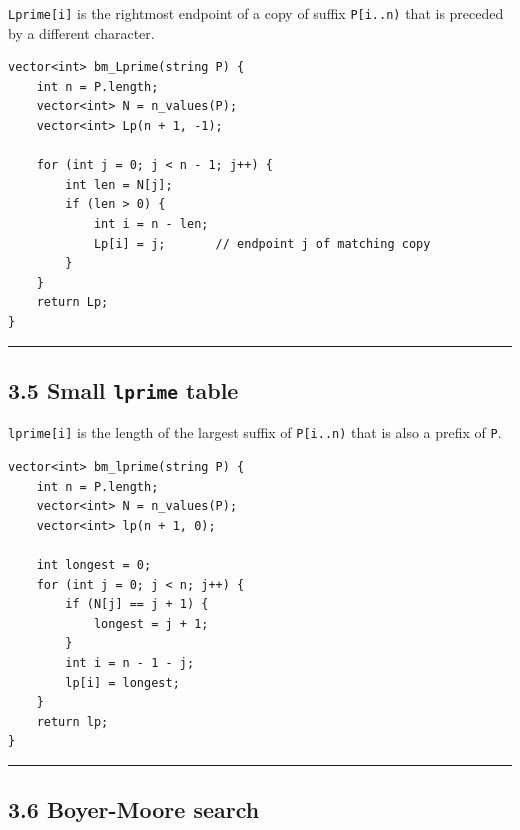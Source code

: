 \documentclass[11pt]{article}
\begin{document}
\texttt{Lprime[i]} is the rightmost endpoint of a copy of suffix \texttt{P[i..n)} that is preceded by a different character.

\begin{verbatim}
vector<int> bm_Lprime(string P) {
    int n = P.length;
    vector<int> N = n_values(P);
    vector<int> Lp(n + 1, -1);

    for (int j = 0; j < n - 1; j++) {
        int len = N[j];
        if (len > 0) {
            int i = n - len;
            Lp[i] = j;       // endpoint j of matching copy
        }
    }
    return Lp;
}
\end{verbatim}

\begin{center}\rule{0.5\linewidth}{0.5pt}\end{center}

\subsection{\texorpdfstring{3.5 Small \texttt{lprime} table}{3.5 Small lprime table}}\label{small-lprime-table}

\texttt{lprime[i]} is the length of the largest suffix of \texttt{P[i..n)} that is also a prefix of \texttt{P}.

\begin{verbatim}
vector<int> bm_lprime(string P) {
    int n = P.length;
    vector<int> N = n_values(P);
    vector<int> lp(n + 1, 0);

    int longest = 0;
    for (int j = 0; j < n; j++) {
        if (N[j] == j + 1) {
            longest = j + 1;
        }
        int i = n - 1 - j;
        lp[i] = longest;
    }
    return lp;
}
\end{verbatim}

\begin{center}\rule{0.5\linewidth}{0.5pt}\end{center}

\subsection{3.6 Boyer-Moore search}\label{boyer-moore-search}
\end{document}
